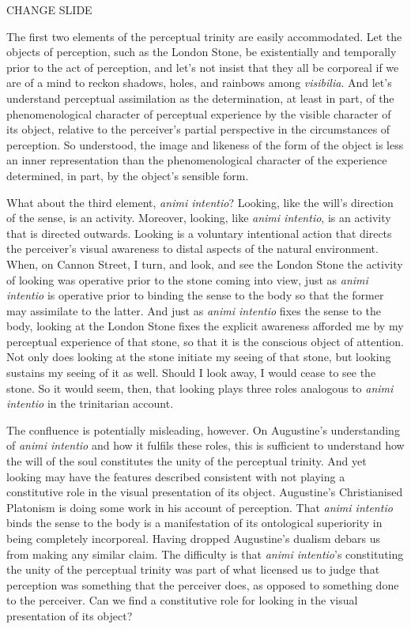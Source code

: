 \documentclass[12pt]{article}
\begin{document}
CHANGE SLIDE

The first two elements of the perceptual trinity are easily accommodated. Let the objects of perception, such as the London Stone, be existentially and temporally prior to the act of perception, and let's not insist that they all be corporeal if we are of a mind to reckon shadows, holes, and rainbows among \emph{visibilia}. And let's understand perceptual assimilation as the determination, at least in part, of the phenomenological character of perceptual experience by the visible character of its object, relative to the perceiver’s partial perspective in the circumstances of perception. So understood, the image and likeness of the form of the object is less an inner representation than the phenomenological character of the experience determined, in part, by the object’s sensible form.

What about the third element, \emph{animi intentio}? Looking, like the will’s direction of the sense, is an activity. Moreover, looking, like \emph{animi intentio}, is an activity that is directed outwards. Looking is a voluntary intentional action that directs the perceiver’s visual awareness to distal aspects of the natural environment. When, on Cannon Street, I turn, and look, and see the London Stone the activity of looking was operative prior to the stone coming into view, just as \emph{animi intentio} is operative prior to binding the sense to the body so that the former may assimilate to the latter. And just as \emph{animi intentio} fixes the sense to the body, looking at the London Stone fixes the explicit awareness afforded me by my perceptual experience of that stone, so that it is the conscious object of attention. Not only does looking at the stone initiate my seeing of that stone, but looking sustains my seeing of it as well. Should I look away, I would cease to see the stone. So it would seem, then, that looking plays three roles analogous to \emph{animi intentio} in the trinitarian account. 

The confluence is potentially misleading, however. On Augustine’s understanding of \emph{animi intentio} and how it fulfils these roles, this is sufficient to understand how the will of the soul constitutes the unity of the perceptual trinity. And yet looking may have the features described consistent with not playing a constitutive role in the visual presentation of its object. Augustine’s Christianised Platonism is doing some work in his account of perception. That \emph{animi intentio} binds the sense to the body is a manifestation of its ontological superiority in being completely incorporeal. Having dropped Augustine’s dualism debars us from making any similar claim. The difficulty is that \emph{animi intentio}’s constituting the unity of the perceptual trinity was part of what licensed us to judge that perception was something that the perceiver does, as opposed to something done to the perceiver. Can we find a constitutive role for looking in the visual presentation of its object?
\end{document}
